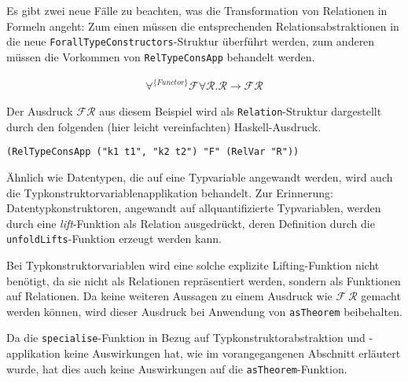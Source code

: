 Es gibt zwei neue Fälle zu beachten, was die Transformation von Relationen in Formeln angeht: Zum einen müssen die
entsprechenden Relationsabstraktionen in die neue \texttt{ForallTypeConstructors}-Struktur überführt werden, zum anderen
müssen die Vorkommen von \texttt{RelTypeConsApp} behandelt werden.


\begin{align*}
\forall^{\{Functor\}} \mathcal{F} \forall \mathcal{R} . \mathcal{R} \rightarrow \mathcal{F} \mathcal{R}
\end{align*}

Der Ausdruck $\mathcal{F} \mathcal{R}$ aus diesem Beispiel wird als \texttt{Relation}-Struktur dargestellt durch den folgenden
(hier leicht vereinfachten) Haskell-Ausdruck.

\begin{verbatim}
(RelTypeConsApp ("k1 t1", "k2 t2") "F" (RelVar "R"))
\end{verbatim}


Ähnlich wie Datentypen, die auf eine Typvariable angewandt werden, wird auch die Typkonstruktorvariablenapplikation
behandelt. Zur Erinnerung: Datentypkonstruktoren, angewandt auf allquantifizierte Typvariablen, werden durch eine
\textit{lift}-Funktion als Relation ausgedrückt, deren Definition durch die \texttt{unfoldLifts}-Funktion erzeugt werden kann.

Bei Typkonstruktorvariablen wird eine solche explizite Lifting-Funktion nicht benötigt, da sie nicht als Relationen repräsentiert
werden, sondern als Funktionen auf Relationen. Da keine weiteren Aussagen zu einem Ausdruck wie $\mathcal{F}\ \mathcal{R}$
gemacht werden können, wird dieser Ausdruck bei Anwendung von \texttt{asTheorem} beibehalten.

Da die \texttt{specialise}-Funktion in Bezug auf Typkonstruktorabstraktion und -applikation keine Auswirkungen hat, wie im
vorangegangenen Abschnitt erläutert wurde, hat dies auch keine Auswirkungen auf die \texttt{asTheorem}-Funktion.

